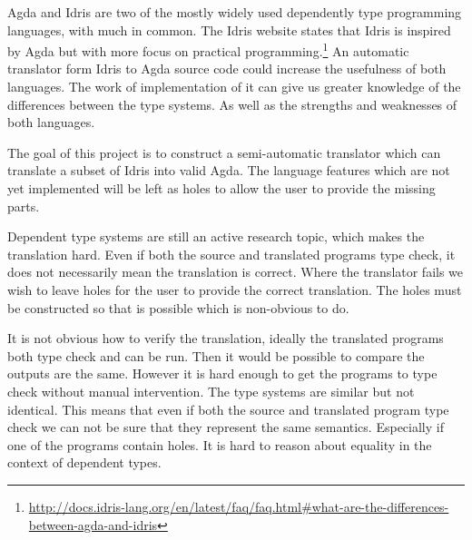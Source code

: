 \documentclass[parskip=half]{scrartcl}
\begin{document}
Agda and Idris are two of the mostly widely used dependently type programming
languages, with much in common. The Idris website states that Idris is inspired
by Agda but with more focus on practical
programming.\footnote{\url{http://docs.idris-lang.org/en/latest/faq/faq.html\#what-are-the-differences-between-agda-and-idris}}
An automatic translator form Idris to Agda source code could increase the
usefulness of both languages. The work of implementation of it can give us
greater knowledge of the differences between the type systems. As well as the
strengths and weaknesses of both languages.

The goal of this project is to construct a semi-automatic translator which can
translate a subset of Idris into valid Agda. The language features which are
not yet implemented will be left as holes to allow the user to provide the
missing parts.



Dependent type systems are still an active research topic, which makes the
translation hard.
Even if both the source and translated programs type check, it does not
necessarily mean the translation is correct.  Where the translator fails we
wish to leave holes for the user to provide the correct translation. The holes
must be constructed so that is possible which is non-obvious to do.

It is not obvious how to verify the translation, ideally the translated
programs both type check and can be run. Then it would be possible to compare
the outputs are the same. However it is hard enough to get the programs to type
check without manual intervention. The type systems are similar but not
identical. This means that even if both the source and translated program
type check we can not be sure that they represent the same semantics.
Especially if one of the programs contain holes. It is hard to reason about
equality in the context of dependent types.
\end{document}
